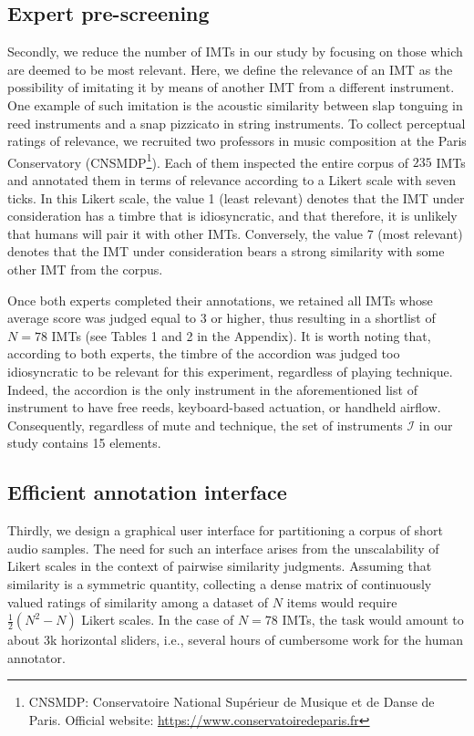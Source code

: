 \documentclass{bmcart}
\makeatletter
\newcommand*{\ie}{i.e.,\@\xspace}
\newcommand{\ja}[1]{\textcolor{purple}{JA: #1}\xspace}
\makeatother
\begin{document}
\subsection*{Expert pre-screening}
Secondly, we reduce the number of IMTs in our study by focusing on those which are deemed to be most relevant.
Here, we define the relevance of an IMT as the possibility of imitating it by means of another IMT from a different instrument.
One example of such imitation is the acoustic similarity between slap tonguing in reed instruments and a snap pizzicato in string instruments.
To collect perceptual ratings of relevance, we recruited two professors in music composition at the Paris Conservatory (CNSMDP\footnote{CNSMDP: Conservatoire National Sup\'erieur de Musique et de Danse de Paris. Official website: \url{https://www.conservatoiredeparis.fr}}).
Each of them inspected the entire corpus of $235$ IMTs and annotated them in terms of relevance according to a Likert scale with seven ticks.
In this Likert scale, the value 1 (least relevant) denotes that the IMT under consideration has a timbre that is idiosyncratic, and that therefore, it is unlikely that humans will pair it with other IMTs.
Conversely, the value 7 (most relevant) denotes that the IMT under consideration bears a strong similarity with some other IMT from the corpus.

Once both experts completed their annotations, we retained all IMTs whose average score was judged equal to 3 or higher, thus resulting in a shortlist of $N=78$ IMTs (see Tables 1 and 2 in the Appendix).
It is worth noting that, according to both experts, the timbre of the accordion was judged too idiosyncratic to be relevant for this experiment, regardless of playing technique.
Indeed, the accordion is the only instrument in the aforementioned list of
instrument to have free reeds, keyboard-based actuation, or handheld airflow.
Consequently, regardless of mute and technique, the set of instruments $\mathcal{I}$ in our study contains 15 elements.

\subsection*{Efficient annotation interface}
Thirdly, we design a graphical user interface for partitioning a corpus of short audio samples.
The need for such an interface arises from the unscalability of Likert scales in the context of pairwise similarity judgments.
Assuming that similarity is a symmetric quantity, collecting a dense matrix of continuously valued ratings of similarity among a dataset of $N$ items would require $\frac{1}{2}(N^2-N)$ Likert scales.
In the case of $N=78$ IMTs, the task would amount to about 3k horizontal sliders, \ie{} several hours of cumbersome work for the human annotator. %
\end{document}
